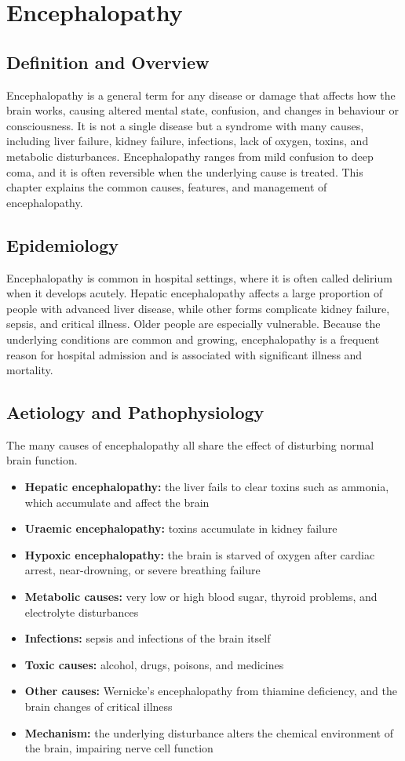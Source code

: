 \chapter{Encephalopathy}

\section*{Definition and Overview}
Encephalopathy is a general term for any disease or damage that affects how the brain works, causing altered mental state, confusion, and changes in behaviour or consciousness. It is not a single disease but a syndrome with many causes, including liver failure, kidney failure, infections, lack of oxygen, toxins, and metabolic disturbances. Encephalopathy ranges from mild confusion to deep coma, and it is often reversible when the underlying cause is treated. This chapter explains the common causes, features, and management of encephalopathy.

\section*{Epidemiology}
Encephalopathy is common in hospital settings, where it is often called delirium when it develops acutely. Hepatic encephalopathy affects a large proportion of people with advanced liver disease, while other forms complicate kidney failure, sepsis, and critical illness. Older people are especially vulnerable. Because the underlying conditions are common and growing, encephalopathy is a frequent reason for hospital admission and is associated with significant illness and mortality.

\section*{Aetiology and Pathophysiology}
The many causes of encephalopathy all share the effect of disturbing normal brain function.
\begin{itemize}
    \item \textbf{Hepatic encephalopathy:} the liver fails to clear toxins such as ammonia, which accumulate and affect the brain
    \item \textbf{Uraemic encephalopathy:} toxins accumulate in kidney failure
    \item \textbf{Hypoxic encephalopathy:} the brain is starved of oxygen after cardiac arrest, near-drowning, or severe breathing failure
    \item \textbf{Metabolic causes:} very low or high blood sugar, thyroid problems, and electrolyte disturbances
    \item \textbf{Infections:} sepsis and infections of the brain itself
    \item \textbf{Toxic causes:} alcohol, drugs, poisons, and medicines
    \item \textbf{Other causes:} Wernicke's encephalopathy from thiamine deficiency, and the brain changes of critical illness
    \item \textbf{Mechanism:} the underlying disturbance alters the chemical environment of the brain, impairing nerve cell function
\end{itemize}

